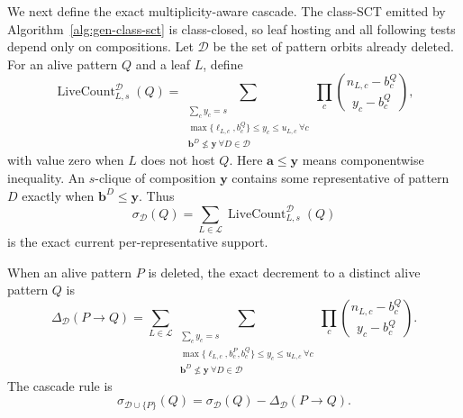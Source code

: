 We next define the exact multiplicity-aware cascade.
%
The class-SCT emitted by Algorithm~\ref{alg:gen-class-sct} is class-closed, so leaf hosting and all following tests depend only on compositions.
%
Let $\mathcal D$ be the set of pattern orbits already deleted.
%
For an alive pattern $Q$ and a leaf $L$, define
\begin{equation}
\label{eq:live-leaf-count}
\operatorname{LiveCount}_{L,s}^{\mathcal D}(Q)
=
\sum_{\substack{
\sum_cy_c=s\\
\max\{\ell_{L,c},b_c^Q\}\leq y_c\leq u_{L,c}\ \forall c\\
\mathbf b^D\nleq\mathbf y\ \forall D\in\mathcal D}}
\prod_c\binom{n_{L,c}-b_c^Q}{y_c-b_c^Q},
\end{equation}
with value zero when $L$ does not host $Q$.
%
Here $\mathbf a\leq\mathbf y$ means componentwise inequality.
%
An $s$-clique of composition $\mathbf y$ contains some representative of pattern $D$ exactly when $\mathbf b^D\leq\mathbf y$.
%
Thus
\begin{equation}
\label{eq:pattern-live-support}
\sigma_{\mathcal D}(Q)=\sum_{L\in\mathcal L}\operatorname{LiveCount}_{L,s}^{\mathcal D}(Q)
\end{equation}
is the exact current per-representative support.

When an alive pattern $P$ is deleted, the exact decrement to a distinct alive pattern $Q$ is
\begin{equation}
\label{eq:aggregate-pattern-decrement}
\Delta_{\mathcal D}(P\to Q)
=
\sum_{L\in\mathcal L}
\sum_{\substack{
\sum_cy_c=s\\
\max\{\ell_{L,c},b_c^P,b_c^Q\}\leq y_c\leq u_{L,c}\ \forall c\\
\mathbf b^D\nleq\mathbf y\ \forall D\in\mathcal D}}
\prod_c\binom{n_{L,c}-b_c^Q}{y_c-b_c^Q}.
\end{equation}
The cascade rule is
\begin{equation}
\label{eq:aggregate-pattern-cascade}
\sigma_{\mathcal D\cup\{P\}}(Q)
=
\sigma_{\mathcal D}(Q)-\Delta_{\mathcal D}(P\to Q).
\end{equation}

